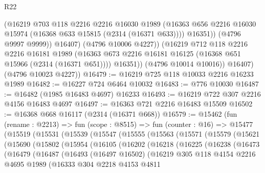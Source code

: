 \begin{lexlean}{R22}
\begin{coremodule}
                    (@16219
                      @703
                      @118
                      @2216
                      @2216
                      @16030
                      @1989
                      (@16363 @656 @2216 @16030 @15974 (@16368 @633 @15815 (@2314 (@16371 @633))))
                      @16351))
                  (@4796 @9997 @9999))
                @16407)
              (@4796 @10006 @4227))
            (@16219
              @712
              @118
              @2216
              @2216
              @16181
              @1989
              (@16363 @673 @2216 @16181 @16125 (@16368 @651 @15966 (@2314 (@16371 @651))))
              @16351))
          (@4796 @10014 @10016))
        @16407)
      (@4796 @10023 @4227))
@16479 := @16219 @725 @118 @10033 @2216 @16233 @1989
@16482 := @16227 @724 @6464 @10032
@16483 := @776 @10030
@16487 := @16482 (@1985 @16483 @4697) @16233
@16493 := @16219 @722 @307 @2216 @4156 @16483 @4697
@16497 := @16363 @721 @2216 @16483 @15509
@16502 := @16368 @668 @16117 (@2314 (@16371 @668))
@16579 := @15462
    (fun (rename : @2213) =>
    fun (scope : @8515) =>
    fun (counter : @16) =>
    @15477
      (@15519
        (@15531
          (@15539
            (@15547
              (@15555
                (@15563
                  (@15571
                    (@15579
                      (@15621
                        (@15690
                          (@15802
                            (@15954
                              (@16105
                                (@16202
                                  (@16218
                                    (@16225
                                      (@16238
                                        (@16473
                                          (@16479
                                            (@16487
                                              (@16493
                                                (@16497 @16502)
                                                (@16219
                                                  @305
                                                  @118
                                                  @4154
                                                  @2216
                                                  @4695
                                                  @1989
                                                  (@16333
                                                    @304
                                                    @2218
                                                    @4153
                                                    @4811

\end{coremodule}
\end{lexlean}
